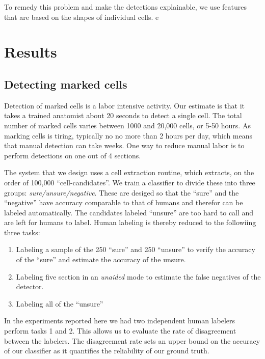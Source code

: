\documentclass[11pt]{article}
\begin{document}
To remedy this problem and make the detections explainable, we use
features that are based on the shapes of individual cells.
\fi
e
\section{Results}

\subsection{Detecting marked cells}
Detection of marked cells is a labor intensive activity. Our estimate
is that it takes a trained anatomist about 20 seconds to detect a
single cell. The total number of marked cells varies between 1000 and
20,000 cells, or 5-50 hours. As marking cells is tiring, typically no
no more than 2 hours per day, which means that manual detection can
take weeks. One way to reduce manual labor is to perform detections
on one out of 4 sections.

The system that we design uses a cell extraction routine, which
extracts, on the order of 100,000 ``cell-candidates''. We train
a classifier to divide these into three groups: {\it
sure/unsure/negative}. These are desiged so that the ``sure'' and the
``negative'' have accuracy comparable to that of humans and therefor
can be labeled automatically. The candidates labeled ``unsure'' are too
hard to call and are left for humans to label. Human labeling is
thereby reduced to the followiing three tasks:
\begin{enumerate}
\item Labeling a sample of the 250 ``sure'' and 250 ``unsure'' to
  verify the accuracy of the ``sure'' and estimate the accuracy of the
  unsure.
  \item Labeling five section in an {\em unaided} mode to estimate the
    false negatives of the detector.
  \item Labeling all of the ``unsure'' 
\end{enumerate}

In the experiments reported here we had two independent human labelers
perform tasks 1 and 2. This allows us to evaluate the rate of
disagreement between the labelers. The disagreement rate sets an upper
bound on the accuracy of our classifier as it quantifies the
reliability of our ground truth.
\end{document}
